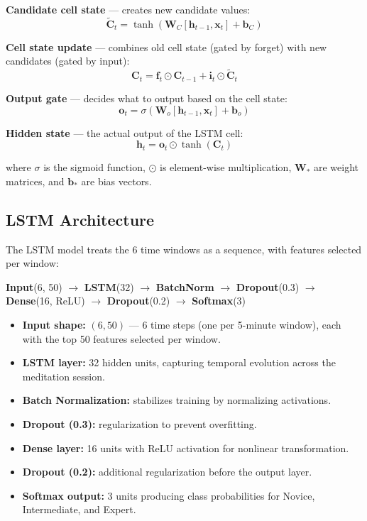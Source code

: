\documentclass[12pt,a4paper]{article}
\begin{document}
\textbf{Candidate cell state} --- creates new candidate values:
\begin{equation}
\tilde{\mathbf{C}}_t = \tanh\left(\mathbf{W}_C [\mathbf{h}_{t-1}, \mathbf{x}_t] + \mathbf{b}_C\right)
\label{eq:candidate}
\end{equation}

\textbf{Cell state update} --- combines old cell state (gated by forget) with new candidates (gated by input):
\begin{equation}
\mathbf{C}_t = \mathbf{f}_t \odot \mathbf{C}_{t-1} + \mathbf{i}_t \odot \tilde{\mathbf{C}}_t
\label{eq:cell}
\end{equation}

\textbf{Output gate} --- decides what to output based on the cell state:
\begin{equation}
\mathbf{o}_t = \sigma\left(\mathbf{W}_o [\mathbf{h}_{t-1}, \mathbf{x}_t] + \mathbf{b}_o\right)
\label{eq:output}
\end{equation}

\textbf{Hidden state} --- the actual output of the LSTM cell:
\begin{equation}
\mathbf{h}_t = \mathbf{o}_t \odot \tanh(\mathbf{C}_t)
\label{eq:hidden}
\end{equation}

where $\sigma$ is the sigmoid function, $\odot$ is element-wise multiplication, $\mathbf{W}_*$ are weight matrices, and $\mathbf{b}_*$ are bias vectors.

\subsection{LSTM Architecture}

The LSTM model treats the 6 time windows as a sequence, with features selected per window:

\begin{center}
\textbf{Input}(6, 50) $\rightarrow$ \textbf{LSTM}(32) $\rightarrow$ \textbf{BatchNorm} $\rightarrow$ \textbf{Dropout}(0.3) $\rightarrow$ \textbf{Dense}(16, ReLU) $\rightarrow$ \textbf{Dropout}(0.2) $\rightarrow$ \textbf{Softmax}(3)
\end{center}

\begin{itemize}
  \item \textbf{Input shape:} $(6, 50)$ --- 6 time steps (one per 5-minute window), each with the top 50 features selected per window.
  \item \textbf{LSTM layer:} 32 hidden units, capturing temporal evolution across the meditation session.
  \item \textbf{Batch Normalization:} stabilizes training by normalizing activations.
  \item \textbf{Dropout (0.3):} regularization to prevent overfitting.
  \item \textbf{Dense layer:} 16 units with ReLU activation for nonlinear transformation.
  \item \textbf{Dropout (0.2):} additional regularization before the output layer.
  \item \textbf{Softmax output:} 3 units producing class probabilities for Novice, Intermediate, and Expert.
\end{itemize}
\end{document}
